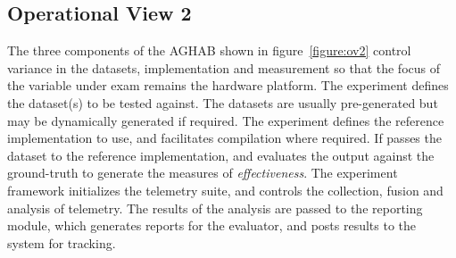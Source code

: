 \subsection{Operational View 2}
The three components of the AGHAB shown in figure~\ref{figure:ov2} control variance in the datasets, implementation and measurement so that the focus of the variable under exam remains the hardware platform. 
The experiment defines the dataset(s) to be tested against.
The datasets are usually pre-generated but may be dynamically generated if required. 
The experiment defines the reference implementation to use, and facilitates compilation where required.
If passes the dataset to the reference implementation, and evaluates the output against the ground-truth to generate the measures of \textit{effectiveness}.
The experiment framework initializes the telemetry suite, and controls the collection, fusion and analysis of telemetry. 
The results of the analysis are passed to the reporting module, which generates reports for the evaluator, and posts results to the system for tracking. 

